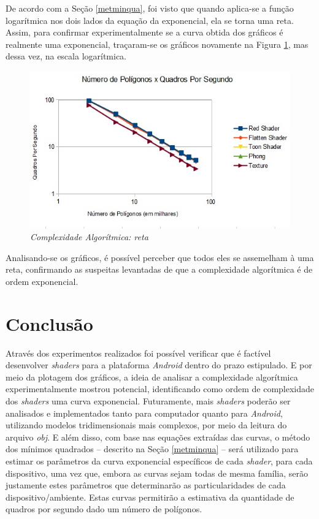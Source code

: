 	De acordo com a Seção \ref{metminqua}, foi visto que quando aplica-se a função logarítmica nos dois lados da equação da exponencial, ela se torna uma reta. Assim, para confirmar experimentalmente se a  curva obtida dos gráficos é realmente uma exponencial, traçaram-se os gráficos novamente na Figura \ref{complexidade_reta}, mas dessa vez, na escala logarítmica. 

	\begin{figure}[h]
	\centering
		\includegraphics[keepaspectratio=true,scale=0.9]{figuras/complexidade_reta.jpg}
	\caption{\textit{Complexidade Algorítmica: reta}}
	\label{complexidade_reta}
	\end{figure}

	Analisando-se os gráficos, é possível perceber que todos eles se assemelham à uma reta, confirmando as suspeitas levantadas de que a complexidade algorítmica é de ordem exponencial.

\chapter[Conclusão]{Conclusão}
\label{conclusao}

	Através dos experimentos realizados foi possível verificar que é factível desenvolver \textit{shaders} para a plataforma \textit{Android} dentro do prazo estipulado. E por meio da plotagem dos gráficos, a ideia de analisar a complexidade algorítmica experimentalmente mostrou potencial, identificando como ordem de complexidade dos \textit{shaders} uma curva exponencial. Futuramente, mais \textit{shaders} poderão ser analisados e implementados tanto para computador quanto para \textit{Android}, utilizando modelos tridimensionais mais complexos, por meio da leitura do arquivo \textit{obj}. E além disso, com base nas equações extraídas das curvas, o método dos mínimos quadrados -- descrito na Seção \ref{metminqua} -- será utilizado para estimar os parâmetros da curva exponencial específicos de cada \textit{shader}, para cada dispositivo, uma vez que, embora as curvas sejam todas de mesma família, serão justamente estes parâmetros que determinarão as particularidades de cada dispositivo/ambiente. Estas curvas permitirão a estimativa da  quantidade de quadros por segundo dado um número de polígonos. 
	
